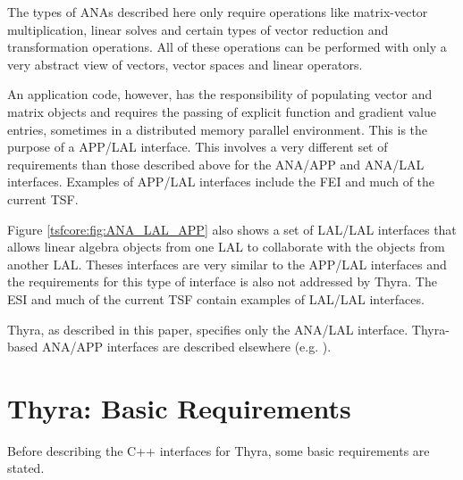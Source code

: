 \documentclass[pdf,ps2pdf,11pt]{SANDreport}
\begin{document}
The types of ANAs described here only require operations like
matrix-vector multiplication, linear solves and certain types of
vector reduction and transformation operations.  All of these
operations can be performed with only a very abstract view of vectors,
vector spaces and linear operators.

An application code, however, has the responsibility of populating
vector and matrix objects and requires the passing of explicit
function and gradient value entries, sometimes in a distributed memory
parallel environment.  This is the purpose of a APP/LAL interface.
This involves a very different set of requirements than those
described above for the ANA/APP and ANA/LAL interfaces.  Examples of
APP/LAL interfaces include the FEI {}\cite{ref:fei} and much of the
current TSF.

Figure {}\ref{tsfcore:fig:ANA_LAL_APP} also shows a set of LAL/LAL
interfaces that allows linear algebra objects from one LAL to
collaborate with the objects from another LAL.  Theses interfaces are
very similar to the APP/LAL interfaces and the requirements for this
type of interface is also not addressed by Thyra.  The ESI
{}\cite{ref:esi_2001} and much of the current TSF contain examples of
LAL/LAL interfaces.

Thyra, as described in this paper, specifies only the
ANA/LAL interface.  Thyra-based ANA/APP interfaces are
described elsewhere (e.g. {}\cite{ref:Thyra::Nonlin}).

%
\section{Thyra: Basic Requirements}
\label{tsfcore:sec:Thyra_requirements}
%

Before describing the C++ interfaces for Thyra, some basic
requirements are stated.
\end{document}
